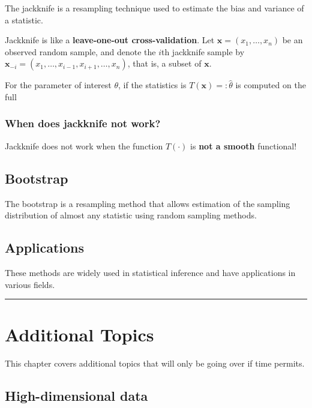 \documentclass[
  letterpaper,
  DIV=11,
  numbers=noendperiod]{scrreprt}
\begin{document}
The jackknife is a resampling technique used to estimate the bias and
variance of a statistic.

Jackknife is like a \textbf{leave-one-out cross-validation}. Let
\(\mathbf{x}= (x_1,\dots,x_n)\) be an observed random sample, and denote
the \(i\)th jackknife sample by
\(\mathbf{x}_{-i} = (x_1,\dots,x_{i-1},x_{i+1},\dots,x_n)\), that is, a
subset of \(\mathbf{x}\).

For the parameter of interest \(\theta\), if the statistics is
\(T(\mathbf{x})=:\hat{\theta}\) is computed on the full

\subsection{When does jackknife not
work?}\label{when-does-jackknife-not-work}

Jackknife does not work when the function \(T(\cdot)\) is \textbf{not a
smooth} functional!

\section{Bootstrap}\label{bootstrap}

The bootstrap is a resampling method that allows estimation of the
sampling distribution of almost any statistic using random sampling
methods.

\section{Applications}\label{applications}

These methods are widely used in statistical inference and have
applications in various fields.

\begin{center}\rule{0.5\linewidth}{0.5pt}\end{center}


\chapter{Additional Topics}\label{additional-topics}

This chapter covers additional topics that will only be going over if
time permits.

\section{High-dimensional data}\label{high-dimensional-data}
\end{document}
